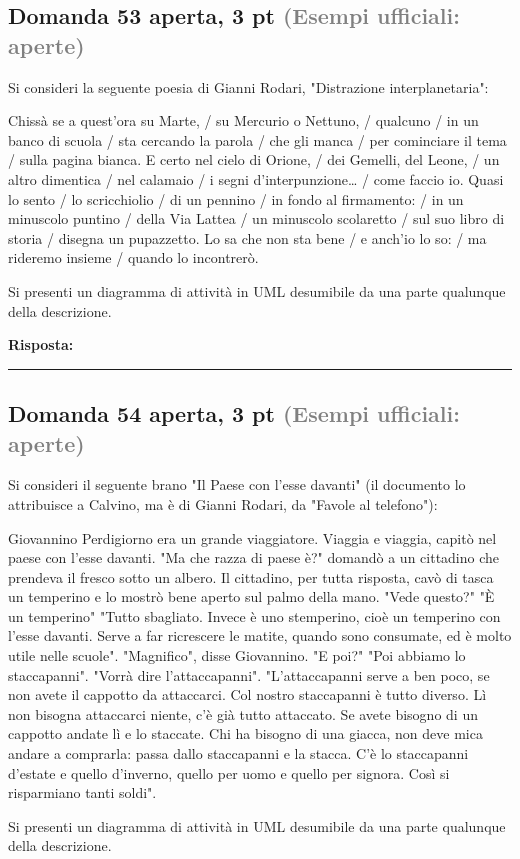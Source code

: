\documentclass[a4paper,11pt]{article}
\begin{document}
\subsection*{Domanda 53 \hfill {\small aperta, 3 pt \textcolor{gray}{(Esempi ufficiali: aperte)}}}
\begin{tcolorbox}[colback=gray!8,colframe=gray!50,title=Contesto]
Si consideri la seguente poesia di Gianni Rodari, "Distrazione interplanetaria":

Chissà se a quest'ora su Marte, / su Mercurio o Nettuno, / qualcuno / in un banco di scuola / sta cercando la parola / che gli manca / per cominciare il tema / sulla pagina bianca.
E certo nel cielo di Orione, / dei Gemelli, del Leone, / un altro dimentica / nel calamaio / i segni d'interpunzione… / come faccio io.
Quasi lo sento / lo scricchiolio / di un pennino / in fondo al firmamento: / in un minuscolo puntino / della Via Lattea / un minuscolo scolaretto / sul suo libro di storia / disegna un pupazzetto.
Lo sa che non sta bene / e anch'io lo so: / ma rideremo insieme / quando lo incontrerò.
\end{tcolorbox}
Si presenti un diagramma di attività in UML desumibile da una parte qualunque della descrizione.

\vspace{0.2cm}
\noindent\textbf{Risposta:}\par
\vspace{4cm}\hrule


\subsection*{Domanda 54 \hfill {\small aperta, 3 pt \textcolor{gray}{(Esempi ufficiali: aperte)}}}
\begin{tcolorbox}[colback=gray!8,colframe=gray!50,title=Contesto]
Si consideri il seguente brano "Il Paese con l'esse davanti" (il documento lo attribuisce a Calvino, ma è di Gianni Rodari, da "Favole al telefono"):

Giovannino Perdigiorno era un grande viaggiatore. Viaggia e viaggia, capitò nel paese con l'esse davanti.
"Ma che razza di paese è?" domandò a un cittadino che prendeva il fresco sotto un albero. Il cittadino, per tutta risposta, cavò di tasca un temperino e lo mostrò bene aperto sul palmo della mano. "Vede questo?" "È un temperino" "Tutto sbagliato. Invece è uno stemperino, cioè un temperino con l'esse davanti. Serve a far ricrescere le matite, quando sono consumate, ed è molto utile nelle scuole". "Magnifico", disse Giovannino. "E poi?" "Poi abbiamo lo staccapanni". "Vorrà dire l'attaccapanni". "L'attaccapanni serve a ben poco, se non avete il cappotto da attaccarci. Col nostro staccapanni è tutto diverso. Lì non bisogna attaccarci niente, c'è già tutto attaccato. Se avete bisogno di un cappotto andate lì e lo staccate. Chi ha bisogno di una giacca, non deve mica andare a comprarla: passa dallo staccapanni e la stacca. C'è lo staccapanni d'estate e quello d'inverno, quello per uomo e quello per signora. Così si risparmiano tanti soldi".
\end{tcolorbox}
Si presenti un diagramma di attività in UML desumibile da una parte qualunque della descrizione.
\end{document}
